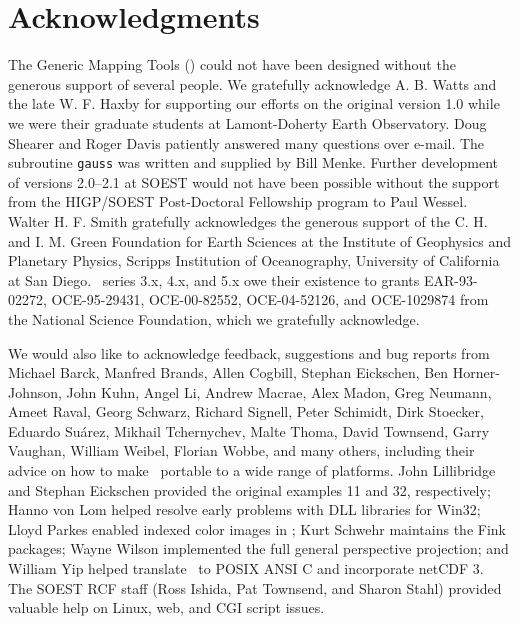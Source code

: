 %
%


\chapter*{Acknowledgments}

The Generic Mapping Tools (\GMT) could not have been designed without
the generous support of several people.  We gratefully acknowledge
A. B. Watts and the late W. F. Haxby for supporting our efforts on the original
version 1.0 while we were their graduate students at Lamont-Doherty
Earth Observatory.  Doug Shearer and Roger Davis patiently answered
many questions over e-mail.  The subroutine \texttt{gauss}
was written and supplied by Bill Menke.
Further development of versions 2.0--2.1 at SOEST would not have
been possible without the support from the HIGP/SOEST
Post-Doctoral Fellowship program to Paul Wessel.  Walter H. F. Smith
gratefully acknowledges the generous support of the C. H. and I. M.
Green Foundation for Earth Sciences at the Institute of Geophysics
and Planetary Physics, Scripps Institution of Oceanography, University
of California at San Diego.
\GMT\ series 3.x, 4.x, and 5.x owe their existence to grants
EAR-93-02272, OCE-95-29431, OCE-00-82552, OCE-04-52126, and OCE-1029874
from the National Science Foundation, which we gratefully acknowledge.

We would also like to acknowledge feedback, suggestions and bug reports
from
Michael Barck,
Manfred Brands,
Allen Cogbill,
Stephan Eickschen,
Ben Horner-Johnson,
John Kuhn,
Angel Li,
Andrew Macrae,
Alex Madon,
Greg Neumann,
Ameet Raval,
Georg Schwarz,
Richard Signell,
Peter Schimidt,
Dirk Stoecker,
Eduardo Su\'{a}rez,
Mikhail Tchernychev,
Malte Thoma,
David Townsend,
Garry Vaughan,
William Weibel,
Florian Wobbe,
and many others, including their advice
on how to make \GMT\ portable to a wide range of platforms.
John Lillibridge and Stephan Eickschen provided the original examples 11 and 32, respectively;
Hanno von Lom helped resolve early problems with DLL libraries for Win32;
Lloyd Parkes enabled indexed color images in \PS;
Kurt Schwehr maintains the \textsf{Fink} packages;
Wayne Wilson implemented the full general perspective projection;
and William Yip helped translate \GMT\ to POSIX ANSI C and incorporate netCDF 3.
The SOEST RCF staff (Ross Ishida, Pat Townsend, and Sharon Stahl) provided valuable help
on Linux, web, and CGI script issues.

